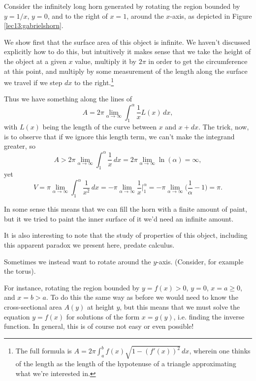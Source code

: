 \begin{example}
	Consider the infinitely long horn generated by rotating the region bounded by $y = 1/x$, $y = 0$, and to the right of $x = 1$, around the $x$-axis, as depicted in Figure \ref{lec13:gabrielshorn}.

	We show first that the surface area of this object is infinite.
	We haven't discussed explicitly how to do this, but intuitively it makes sense that we take the height of the object at a given $x$ value, multiply it by $2 \pi$ in order to get the circumference at this point, and multiply by some measurement of the length along the surface we travel if we step $d x$ to the right.\footnote{The full formula is $A = 2 \pi \int_a^b f(x) \sqrt{1 - (f'(x))^2} \, d x$, wherein one thinks of the length as the length of the hypotenuse of a triangle approximating what we're interested in.}

	Thus we have something along the lines of
	\[
		A = 2\pi \lim_{\alpha \to \infty} \int_1^\alpha \frac{1}{x} L(x) \, d x,
	\]
	with $L(x)$ being the length of the curve between $x$ and $x + d x$.
	The trick, now, is to observe that if we ignore this length term, we can't make the integrand greater, so
	\[
		A > 2\pi \lim_{\alpha \to \infty} \int_1^\alpha \frac{1}{x} \, d x = 2 \pi \lim_{\alpha \to \infty} \ln(\alpha) = \infty,
	\]
	yet
	\[
		V = \pi \lim_{\alpha \to \infty} \int_1^\alpha \frac{1}{x^2} \, d x = - \pi \lim_{\alpha \to \infty} \frac{1}{x} \biggr \rvert_1^\alpha = - \pi \lim_{\alpha \to \infty} \Big ( \frac{1}{\alpha} - 1 \Big ) = \pi.
	\]

	\noindent
	In some sense this means that we can fill the horn with a finite amount of paint, but it we tried to paint the inner surface of it we'd need an infinite amount.

	It is also interesting to note that the study of properties of this object, including this apparent paradox we present here, predate calculus.
\end{example}

\noindent
Sometimes we instead want to rotate around the $y$-axis.
(Consider, for example the torus).

For instance, rotating the region bounded by $y = f(x) > 0$, $y = 0$, $x = a \geq 0$, and $x = b > a$.
To do this the same way as before we would need to know the cross-sectional area $A(y)$ at height $y$, but this means that we must solve the equation $y = f(x)$ for solutions of the form $x = g(y)$, i.e. finding the inverse function.
In general, this is of course not easy or even possible!

